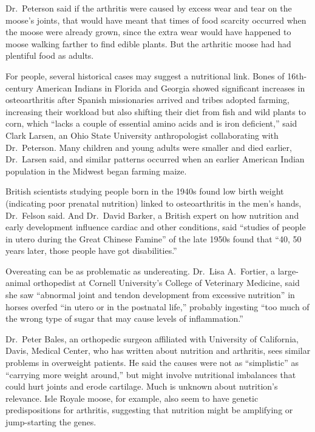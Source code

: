 ﻿\documentclass[12pt]{article}
\begin{document}
Dr.~Peterson said if the arthritis were caused by excess wear and tear on the moose's joints, that
would have meant that times of food scarcity occurred when the moose were already grown, since the
extra wear would have happened to moose walking farther to find edible plants. But the arthritic
moose had had plentiful food as adults.

For people, several historical cases may suggest a nutritional link. Bones of 16th-century American
Indians in Florida and Georgia showed significant increases in osteoarthritis after Spanish
missionaries arrived and tribes adopted farming, increasing their workload but also shifting their
diet from fish and wild plants to corn, which ``lacks a couple of essential amino acids and is iron
deficient,'' said Clark Larsen, an Ohio State University anthropologist collaborating with
Dr.~Peterson. Many children and young adults were smaller and died earlier, Dr.~Larsen said, and
similar patterns occurred when an earlier American Indian population in the Midwest began farming
maize.

British scientists studying people born in the 1940s found low birth weight (indicating poor
prenatal nutrition) linked to osteoarthritis in the men's hands, Dr.~Felson said. And Dr.~David
Barker, a British expert on how nutrition and early development influence cardiac and other
conditions, said ``studies of people in utero during the Great Chinese Famine'' of the late 1950s
found that ``40, 50 years later, those people have got disabilities.''

Overeating can be as problematic as undereating. Dr.~Lisa A.~Fortier, a large-animal orthopedist at
Cornell University's College of Veterinary Medicine, said she saw ``abnormal joint and tendon
development from excessive nutrition'' in horses overfed ``in utero or in the postnatal life,''
probably ingesting ``too much of the wrong type of sugar that may cause levels of inflammation.''

Dr.~Peter Bales, an orthopedic surgeon affiliated with University of California, Davis, Medical
Center, who has written about nutrition and arthritis, sees similar problems in overweight patients.
He said the causes were not as ``simplistic'' as ``carrying more weight around,'' but might involve
nutritional imbalances that could hurt joints and erode cartilage. Much is unknown about nutrition's
relevance. Isle Royale moose, for example, also seem to have genetic predispositions for arthritis,
suggesting that nutrition might be amplifying or jump-starting the genes.
\end{document}
